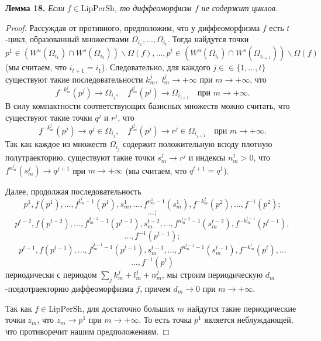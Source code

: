 \documentclass[12pt]{article}
\begin{document}
\textbf{Лемма 18.} \textit{Если} $f\in\mbox{LipPerSh}$\textit{, то диффеоморфизм $f$ не содержит циклов.}

\begin{proof}
Рассуждая от противного, предположим, что у диффеоморфизма $f$ есть $t$-цикл, образованный множествами $\Omega_{i_1},\ldots,\Omega_{i_t}$. 
Тогда найдутся точки
$$p^1\in (W^u(\Omega_{i_1})\cap W^s(\Omega_{i_2}))\backslash\Omega(f),\ldots,
p^t\in (W^u(\Omega_{i_t})\cap W^s(\Omega_{i_{t+1}}))\backslash\Omega(f)$$
(мы считаем, что $i_{t+1}=i_1$).
Следовательно, для каждого $j\in\allowbreak\in\{1,\ldots,t\}$ существуют такие последовательности $k^j_m,$ $l^j_m\allowbreak\longrightarrow+\infty$ при $m\rightarrow+\infty$, что
$$f^{-k^j_m}(p^j)\longrightarrow\Omega_{i_j},\quad f^{l^j_m}(p^j)\longrightarrow\Omega_{i_{j+1}}\quad\mbox{при }m\rightarrow+\infty.$$
В силу компактности соответствующих базисных множеств можно считать, что существуют такие точки $q^j$ и $r^j$, что
$$f^{-k^j_m}(p^j)\longrightarrow q^j\in\Omega_{i_j},\quad f^{l^j_m}(p^j)\longrightarrow r^j\in\Omega_{i_{j+1}}\quad\mbox{при }m\rightarrow+\infty.$$
Так как каждое из множеств $\Omega_{i_j}$ содержит положительную всюду плотную полутраекторию, существуют такие точки $s_m^j\longrightarrow r^j$ и индексы $n_m^j>0$, что $f^{n_m^j}(s_m^j)\longrightarrow q^{j+1}$ при $m\rightarrow+\infty$ (мы считаем, что $q^{t+1}=q^1$). %

Далее, продолжая последовательность
$$p^1,f(p^1),\ldots, f^{l_m^1-1}(p^1),s_m^1,\ldots,f^{n_m^1-1}(s_m^1),f^{-k_m^2}(p^2),\ldots,f^{-1}(p^2);$$
$$\ldots;$$
$$p^{t-2},f(p^{t-2}),\ldots, f^{l_m^{t-2}-1}(p^{t-2}),s_m^{t-2},\ldots,f^{n_m^{t-2}-1}(s_m^{t-2}),f^{-k_m^{t-1}}(p^{t-1}),$$
$$\ldots,f^{-1}(p^{t-1});$$
$$p^{t-1},f(p^{t-1}),\ldots, f^{l_m^{t-1}-1}(p^{t-1}),s_m^{t-1},\ldots,f^{n_m^{t-1}-1}(s_m^{t-1}),f^{-k_m^{t}}(p^{t}),\ldots$$
$$\ldots,f^{-1}(p^{t})$$
периодически с периодом $\sum_{j}k^j_m+l_m^j+n_m^j$, мы строим периодическую $d_m$-пседотраекторию диффеоморфизма $f$, причем $d_m\longrightarrow0$ при $m\rightarrow+\infty$.

Так как $f\in\mbox{LipPerSh}$, для достаточно больших $m$ найдутся такие периодические точки $z_m$, что $z_m\longrightarrow p^1$ при $m\rightarrow+\infty$. То есть точка $p^1$ является неблуждающей, что противоречит нашим предположениям.  
\end{proof}
\end{document}
